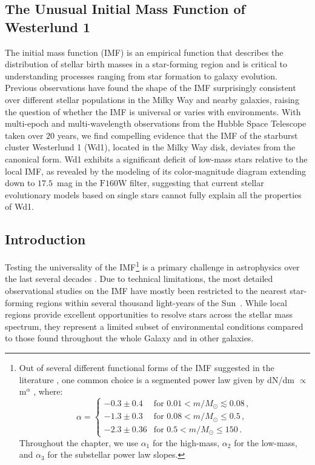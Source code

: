 \documentclass[12pt]{ucsddissertation}
\begin{document}
\begin{CJK*}{UTF8}{gbsn}
\chapter{The Unusual Initial Mass Function of Westerlund 1}
\label{chapter:imf}
The initial mass function (IMF) is an empirical function that describes the distribution of stellar birth masses in a star-forming region and is critical to understanding processes ranging from star formation to galaxy evolution. Previous observations have found the shape of the IMF surprisingly consistent over different stellar populations in the Milky Way and nearby galaxies, raising the question of whether the IMF is universal or varies with environments. With multi-epoch and multi-wavelength observations from the Hubble Space Telescope taken over $20$ years, we find compelling evidence that the IMF of the starburst cluster Westerlund 1 (Wd1), located in the Milky Way disk, deviates from the canonical form. Wd1 exhibits a significant deficit of low-mass stars relative to the local IMF, as revealed by the modeling of its color-magnitude diagram extending down to $17.5$~mag in the $\mathrm{F160W}$ filter, suggesting that current stellar evolutionary models based on single stars cannot fully explain all the properties of Wd1.



\section{Introduction}
\label{imf-sec:intro}

Testing the universality of the IMF\footnote{Out of several different functional forms of the IMF suggested in the literature \citep[][]{Chabrier-2005}, one common choice is a segmented power law given by dN/dm $\propto$ m$^{\alpha}$ \citep[][]{Kroupa-2002}, where: \begin{equation}
\alpha =
\begin{cases}
-0.3 \pm 0.4 & \text{for } 0.01 < m / M_{\odot} \lesssim 0.08\,,\\
-1.3 \pm 0.3 & \text{for } 0.08 < m / M_{\odot} \leq 0.5\,, \\
-2.3 \pm 0.36 & \text{for } 0.5 < m / M_{\odot} \leq 150\,.
\end{cases}
\end{equation} Throughout the chapter, we use $\alpha_1$ for the high-mass, $\alpha_2$ for the low-mass, and $\alpha_3$ for the substellar power law slopes.} is a primary challenge in astrophysics over the last several decades \cite[][]{Bastian-2010}. Due to technical limitations, the most detailed observational studies on the IMF have mostly been restricted to the nearest star-forming regions within several thousand light-years of the Sun~\cite{Luhman-2007, Luhman-2009, Sung-2010, Bayo-2011, DaRio-2012, Scholz-2012, PenaRamirez-2012, AlvesdeOliveira-2013}.  While local regions provide excellent opportunities to resolve stars across the stellar mass spectrum, they represent a limited subset of environmental conditions compared to those found throughout the whole Galaxy and in other galaxies. 


\end{CJK*}
\end{document}
